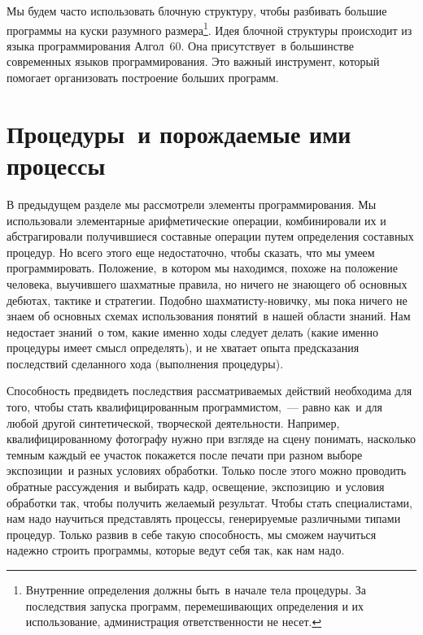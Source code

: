 Мы будем часто использовать блочную структуру, чтобы
разбивать большие программы на куски разумного
размера\footnote{\label{F1.28}%
\samepage%
\nopagebreak
Внутренние определения должны быть~в начале тела процедуры.  
За последствия запуска программ, перемешивающих определения 
и их использование, администрация ответственности не несет.}.
Идея
блочной структуры происходит из языка программирования 
Алгол~60. Она присутствует~в большинстве современных языков
программирования.  Это важный инструмент, который помогает
организовать построение больших программ.

\section{Процедуры~и порождаемые ими процессы}
\label{PROCEDURES-AND-THE-PROCESSES-THEY-GENERATE}

В предыдущем разделе мы рассмотрели элементы
программирования. Мы использовали элементарные арифметические операции, 
комбинировали их и абстрагировали получившиеся составные
операции путем определения составных процедур.  Но всего этого еще
недостаточно, чтобы  сказать, что мы умеем программировать.
Положение,~в котором мы находимся, похоже на положение человека,
выучившего шахматные правила, но ничего не знающего об
основных дебютах, тактике и стратегии.  Подобно
шахматисту-новичку, мы пока ничего не знаем об основных схемах
использования понятий~в нашей области знаний.  Нам недостает знаний~о том,
какие именно ходы следует делать (какие именно процедуры имеет
смысл определять), и не хватает опыта предсказания последствий
сделанного хода (выполнения процедуры).


Способность предвидеть последствия рассматриваемых действий
необходима для того, чтобы стать квалифицированным
программистом,~--- равно как~и для любой другой синтетической, творческой
деятельности.  Например, квалифицированному фотографу
нужно при взгляде на сцену понимать, насколько темным каждый ее участок
покажется после печати при разном выборе экспозиции~и разных
условиях обработки.  Только после этого можно проводить
обратные рассуждения~и выбирать кадр, освещение, экспозицию~и 
условия обработки так, чтобы получить желаемый результат.  Чтобы стать 
специалистами, нам надо научиться представлять процессы, генерируемые
различными типами процедур.  Только развив в себе 
такую способность, мы сможем научиться надежно строить программы,
которые ведут себя так, как нам надо.

